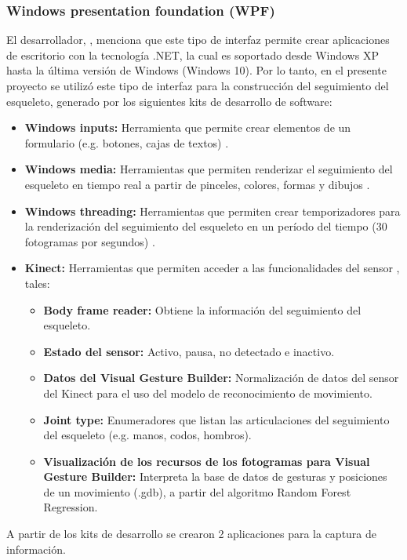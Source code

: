 \subsubsection{Windows presentation foundation (WPF)}
\label{ins:UI:wpf}
El desarrollador, , menciona que este tipo de interfaz permite crear aplicaciones de escritorio con la tecnolog\'ia .NET, la cual es soportado desde Windows XP hasta la \'ultima versi\'on de Windows (Windows 10). Por lo tanto, en el presente proyecto se utiliz\'o este tipo de interfaz para la construcci\'on del seguimiento del esqueleto, generado por los siguientes kits de desarrollo de software:
\begin{itemize}
	\item \textbf{Windows inputs:} Herramienta que permite crear elementos de un formulario (e.g. botones, cajas de textos) \cite{wpfWindows2019}.
	\item \textbf{Windows media:} Herramientas que permiten renderizar el seguimiento del esqueleto en tiempo real a partir de pinceles, colores, formas y dibujos \cite{WindowMedia2019}.
	\item \textbf{Windows threading:} Herramientas que permiten crear temporizadores para la renderizaci\'on del seguimiento del esqueleto en un per\'iodo del tiempo (30 fotogramas por segundos) \cite{WindowThreading2019}.
	\item \textbf{Kinect:} Herramientas que permiten acceder a las funcionalidades del sensor \cite{WindowKinect2019}, tales:
	\begin{itemize}
					\item \textbf{Body frame reader:} Obtiene la informaci\'on del seguimiento del esqueleto.
				\item \textbf{Estado del sensor:} Activo, pausa, no detectado e inactivo.
				\item \textbf{Datos del Visual Gesture Builder:} Normalizaci\'on de datos del sensor del Kinect para el uso del modelo de reconocimiento de movimiento.
			\item \textbf{Joint type:} Enumeradores que listan las articulaciones del seguimiento del esqueleto (e.g. manos, codos, hombros).
			\item \textbf{Visualizaci\'on de los recursos de los fotogramas para Visual Gesture Builder:} Interpreta la base de datos de gesturas y posiciones de un movimiento (.gdb), a partir del algoritmo Random Forest Regression.
	\end{itemize}	 
\end{itemize}
A partir de los kits de desarrollo se crearon 2 aplicaciones para la captura de informaci\'on.
